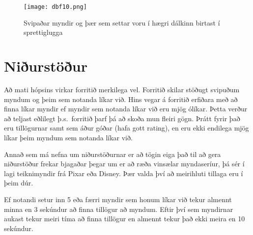 \documentclass[12pt, git, draft]{rureport}
\begin{document}
\begin{figure}
	\centering 
	\texttt{[image: dbf10.png]}
	\caption{Svipaðar myndir og þær sem settar voru í hægri dálkinn birtast í sprettiglugga\label{fig:dbf10}}
\end{figure}
\pagebreak
\section{Niðurstöður}
Að mati hópsins virkar forritið merkilega vel. Forritið skilar stöðugt svipuðum myndum og þeim sem notanda líkar við. Hins vegar á forritið erfiðara með að finna líkar myndir ef myndir sem notanda líkar við eru mjög ólíkar. Þetta verður að teljast eðlilegt þ.s.~forritið þarf þá að skoða mun fleiri gögn. Þrátt fyrir það eru tillögurnar samt sem áður góðar (hafa gott rating), en eru ekki endilega mjög líkar þeim myndum sem notanda líkar við.

Annað sem má nefna um niðurstöðurnar er að tögin eiga það til að gera niðurstöður frekar bjagaðar þegar um er að ræða vinsælar myndaseríur, þá sér í lagi teiknimyndir frá Pixar eða Disney. Þær valda því að meirihluti tillaga eru í þeim dúr.

Ef notandi setur inn 5 eða færri myndir sem honum líkar við tekur almennt minna en 3 sekúndur að finna tillögur að myndum. Eftir því sem myndirnar aukast tekur meiri tíma að finna tillögur en almennt tekur það ekki meira en 10 sekúndur.
\end{document}

